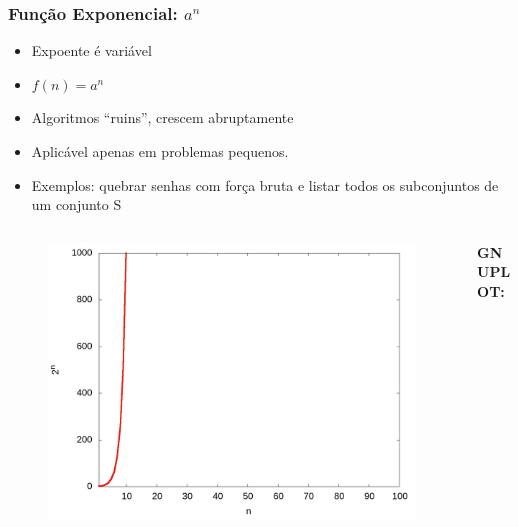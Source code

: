 \documentclass[aspectratio=169]{beamer}
\begin{document}
\begin{frame}\frametitle{Função Exponencial: $a^n$}
\begin{itemize}
	\item Expoente é variável
	\item $f(n) = a^n$
	\item Algoritmos ``ruins'', crescem abruptamente
	\item Aplicável apenas em problemas pequenos.
	\item Exemplos: quebrar senhas com força bruta e listar todos os subconjuntos de um conjunto S
\end{itemize}
\vspace{-5mm}
\begin{columns}[T]
\begin{column}{0.6\linewidth}
\begin{figure}[h]
	\centering
	\includegraphics[height=0.5\paperheight]{graficos/2^n.jpg}
\end{figure}
\end{column}
\begin{column}{0.4\linewidth}
\vspace{5mm}
{\fontsize{0}{4}\selectfont{}\textbf{GNUPLOT:}

}
\end{column}
\end{columns}
\end{frame}
\end{document}
